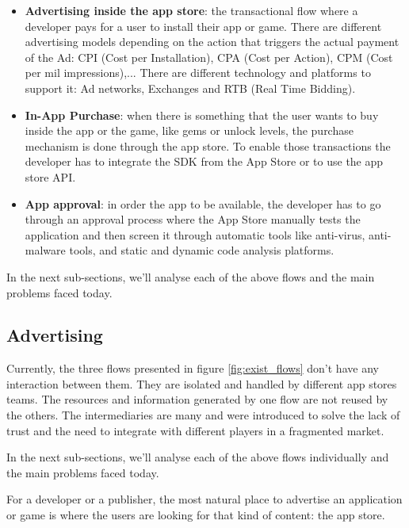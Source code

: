 \begin{itemize}
\item {\bf Advertising inside the app store}: the transactional flow where a developer pays for a user to install their app or game. There are different advertising models depending on the action that triggers the actual payment of the Ad: CPI (Cost per Installation), CPA (Cost per Action), CPM (Cost per mil impressions),... There are different technology and platforms to support it: Ad networks, Exchanges and RTB (Real Time Bidding).
\item {\bf In-App Purchase}: when there is something that the user wants to buy inside the app or the game, like gems or unlock levels, the purchase mechanism is done through the app store. To enable those transactions the developer has to integrate the SDK from the App Store or to use the app store API.
\item {\bf App approval}: in order the app to be available, the developer has to go through an approval process where the App Store manually tests the application and then screen it through automatic tools like anti-virus, anti-malware tools, and static and dynamic code analysis platforms.
\end{itemize}

In the next sub-sections, we'll analyse each of the above flows and the main problems faced today.

\subsection{Advertising}


Currently, the three flows presented in figure \ref{fig:exist_flows} don't have any interaction between them. They are isolated and handled by different app stores teams. The resources and information generated by one flow are not reused by the others. The intermediaries are many and were introduced to solve the lack of trust and the need to integrate with different players in a fragmented market.  


In the next sub-sections, we'll analyse each of the above flows individually and the main problems faced today.


For a developer or a publisher, the most natural place to advertise an application or game is where the users are looking for that kind of content: the app store.

